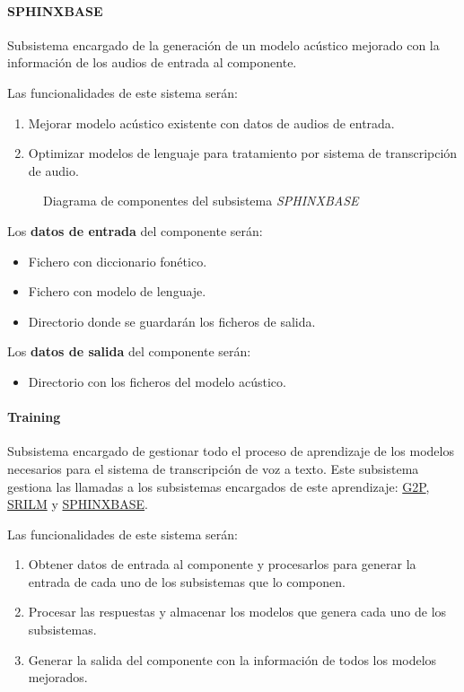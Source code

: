 \documentclass[../main.tex]{subfiles}
\begin{document}
\paragraph{SPHINXBASE}\label{par:sphinxbase}
Subsistema encargado de la generación de un modelo acústico mejorado con la información de los audios de entrada al componente.

Las funcionalidades de este sistema serán:
\begin{enumerate}
    \item Mejorar modelo acústico existente con datos de audios de entrada.
    \item Optimizar modelos de lenguaje para tratamiento por sistema de transcripción de audio.
\end{enumerate}

\begin{figure}[H]
    \centering
    
    \label{fig:components_sphinxbase}
    \caption{Diagrama de componentes del subsistema \textit{SPHINXBASE}}
\end{figure}

Los \textbf{datos de entrada} del componente serán:
\begin{itemize}
    \item Fichero con diccionario fonético.
    \item Fichero con modelo de lenguaje.
    \item Directorio donde se guardarán los ficheros de salida.
\end{itemize}

Los \textbf{datos de salida} del componente serán:
\begin{itemize}
    \item Directorio con los ficheros del modelo acústico.
\end{itemize}

\paragraph{Training}\label{par:training}
Subsistema encargado de gestionar todo el proceso de aprendizaje de los modelos necesarios para el sistema de transcripción de voz a texto. Este subsistema gestiona las llamadas a los subsistemas encargados de este aprendizaje: \hyperref[par:g2p]{G2P}, \hyperref[par:srilm]{SRILM} y \hyperref[par:sphinxbase]{SPHINXBASE}.

Las funcionalidades de este sistema serán:
\begin{enumerate}
    \item Obtener datos de entrada al componente y procesarlos para generar la entrada de cada uno de los subsistemas que lo componen.
    \item Procesar las respuestas y almacenar los modelos que genera cada uno de los subsistemas.
    \item Generar la salida del componente con la información de todos los modelos mejorados.
\end{enumerate}
\end{document}
